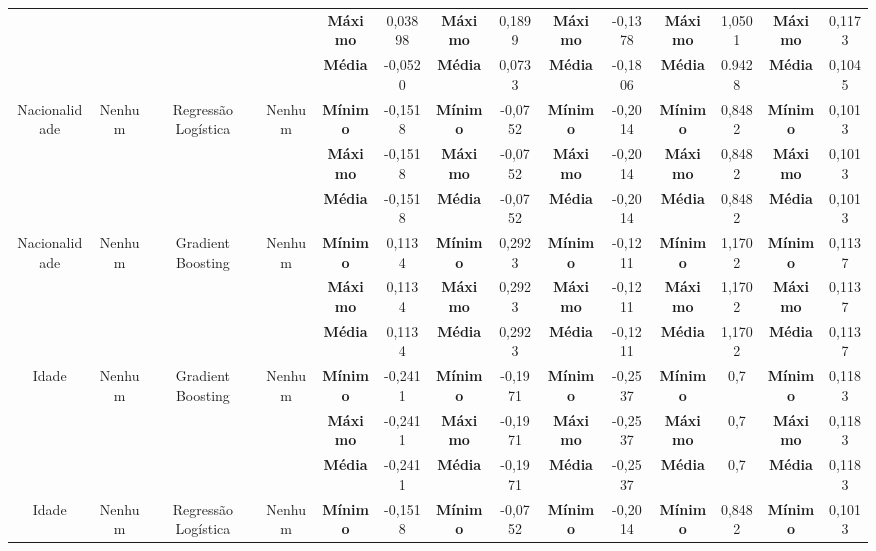 \documentclass[portugues]{ic-tese}
\begin{document}
\begin{table}[H]
\begin{center}
{\begin{tabular}{c|c|c|c|c|c|c|c|c|c|c|c|c|c}
             & & & & \textbf{Máximo} & 0,03898 & \textbf{Máximo} & 0,1899 & \textbf{Máximo} & -0,1378 & \textbf{Máximo} & 1,0501 & \textbf{Máximo} & 0,1173 \\
             & & & & \textbf{Média} & -0,0520 & \textbf{Média} & 0,0733 & \textbf{Média} & -0,1806 & \textbf{Média} & 0.9428 & \textbf{Média} & 0,1045 \\
            \hline
            \multirow{3}{*}{Nacionalidade} & \multirow{3}{*}{Nenhum} & \multirow{3}{*}{Regressão Logística} & \multirow{3}{*}{Nenhum} & \textbf{Mínimo} & -0,1518 & \textbf{Mínimo} & -0,0752 & \textbf{Mínimo} & -0,2014 & \textbf{Mínimo} & 0,8482 & \textbf{Mínimo} & 0,1013 \\
             & & & & \textbf{Máximo} & -0,1518 & \textbf{Máximo} & -0,0752 & \textbf{Máximo} & -0,2014 & \textbf{Máximo} & 0,8482 & \textbf{Máximo} & 0,1013 \\
             & & & & \textbf{Média} & -0,1518 & \textbf{Média} & -0,0752 & \textbf{Média} & -0,2014 & \textbf{Média} & 0,8482 & \textbf{Média} & 0,1013 \\
            \hline
            \multirow{3}{*}{Nacionalidade} & \multirow{3}{*}{Nenhum} & \multirow{3}{*}{Gradient Boosting} & \multirow{3}{*}{Nenhum} & \textbf{Mínimo} & 0,1134 & \textbf{Mínimo} & 0,2923 & \textbf{Mínimo} & -0,1211 & \textbf{Mínimo} & 1,1702 & \textbf{Mínimo} & 0,1137 \\
             & & & & \textbf{Máximo} & 0,1134 & \textbf{Máximo} & 0,2923 & \textbf{Máximo} & -0,1211 & \textbf{Máximo} & 1,1702 & \textbf{Máximo} & 0,1137 \\
             & & & & \textbf{Média} & 0,1134 & \textbf{Média} & 0,2923 & \textbf{Média} & -0,1211 & \textbf{Média} & 1,1702 & \textbf{Média} & 0,1137 \\
            \hline
            \multirow{3}{*}{Idade} & \multirow{3}{*}{Nenhum} & \multirow{3}{*}{Gradient Boosting} & \multirow{3}{*}{Nenhum} & \textbf{Mínimo} & -0,2411 & \textbf{Mínimo} & -0,1971 & \textbf{Mínimo} & -0,2537 & \textbf{Mínimo} & 0,7 & \textbf{Mínimo} & 0,1183 \\
             & & & & \textbf{Máximo} & -0,2411 & \textbf{Máximo} & -0,1971 & \textbf{Máximo} & -0,2537 & \textbf{Máximo} & 0,7 & \textbf{Máximo} & 0,1183 \\
             & & & & \textbf{Média} & -0,2411 & \textbf{Média} & -0,1971 & \textbf{Média} & -0,2537 & \textbf{Média} & 0,7 & \textbf{Média} & 0,1183 \\
            \hline
            \multirow{3}{*}{Idade} & \multirow{3}{*}{Nenhum} & \multirow{3}{*}{Regressão Logística} & \multirow{3}{*}{Nenhum} & \textbf{Mínimo} & -0,1518 & \textbf{Mínimo} & -0,0752 & \textbf{Mínimo} & -0,2014 & \textbf{Mínimo} & 0,8482 & \textbf{Mínimo} & 0,1013 \\

\end{tabular}}
\end{center}
\end{table}
\end{document}
